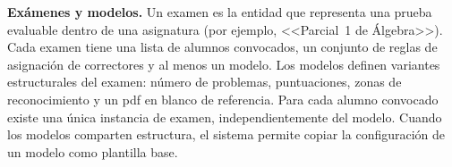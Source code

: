 
\item \textbf{Exámenes y modelos.} \label{rf:exams}
Un examen es la entidad que representa una prueba evaluable dentro de una asignatura (por
ejemplo, <<Parcial~1 de Álgebra>>). Cada examen tiene una lista de alumnos convocados, un
conjunto de reglas de asignación de correctores y al menos un modelo. Los modelos definen
variantes estructurales del examen: número de problemas, puntuaciones, zonas de
reconocimiento y un \acs{pdf} en blanco de referencia. Para cada alumno convocado existe
una única instancia de examen, independientemente del modelo. Cuando los modelos comparten
estructura, el sistema permite copiar la configuración de un modelo como plantilla base.

